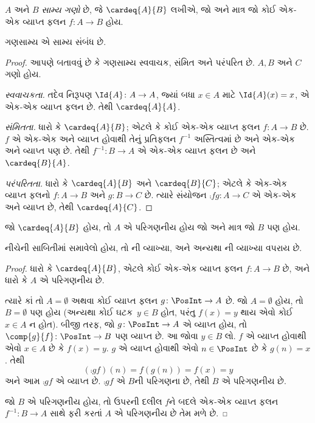 \begin{defn}
  $A$ અને $B$ \emph{સામ્ય ગણો} છે, જે $\cardeq{A}{B}$ લખીએ,
  જો અને માત્ર જો કોઈ એક-એક વ્યાપ્ત ફલન $f \colon A \to B$ હોય.
\end{defn}

\begin{prop}
ગણસામ્ય એ સામ્ય સંબંધ છે.
\end{prop}

\begin{proof}
આપણે બતાવવું છે કે ગણસામ્ય સ્વવાચક, સંમિત અને પરંપરિત છે.
$A, B$ અને $C$ ગણો હોય.

\emph{સ્વવાચકતા.} તદેવ નિરૂપણ $\Id{A} \colon A \to A$, જ્યાં
બધા $x \in A$ માટે $\Id{A} (x) = x$, એ એક-એક વ્યાપ્ત ફલન છે.
તેથી $\cardeq{A}{A}$.

\emph{સંમિતતા.} ધારો કે $\cardeq{A}{B}$; એટલે કે કોઈ
એક-એક વ્યાપ્ત ફલન $f\colon A \to B$ છે. $f$ એ એક-એક અને વ્યાપ્ત હોવાથી
તેનું પ્રતિફલન $f^{-1}$ અસ્તિત્વમાં છે અને એક-એક અને વ્યાપ્ત પણ છે.
તેથી $f^{-1}\colon B \to A$ એ એક-એક વ્યાપ્ત ફલન છે અને
$\cardeq{B}{A}$.

\emph{પરંપરિતતા.} ધારો કે $\cardeq{A}{B}$ અને $\cardeq{B}{C}$;
એટલે કે એક-એક વ્યાપ્ત ફલનો $f\colon A \to B$ અને $g\colon B \to
C$ છે. ત્યારે સંયોજન $\comp{f}{g}\colon A \to C$ એ એક-એક અને વ્યાપ્ત
છે, તેથી $\cardeq{A}{C}$.
\end{proof}

\begin{prop}
જો $\cardeq{A}{B}$ હોય, તો $A$ એ પરિગણનીય હોય જો અને
માત્ર જો $B$ પણ હોય.
\end{prop}

\begin{editorial}
નીચેની સાબિતીમાં  સમાવેલો હોય, તો
ની વ્યાખ્યા, અને અન્યથા
ની વ્યાખ્યા વપરાય છે.
\end{editorial}

\begin{proof}
ધારો કે $\cardeq{A}{B}$, એટલે કોઈ એક-એક વ્યાપ્ત ફલન
$f \colon A \to B$ છે, અને ધારો કે $A$ એ પરિગણનીય છે.

  ત્યારે કાં તો $A = \emptyset$ અથવા કોઈ વ્યાપ્ત ફલન
  $g\colon \PosInt \to A$ છે. જો $A = \emptyset$ હોય, તો
  $B = \emptyset$ પણ હોય (અન્યથા કોઈ ઘટક~$y \in B$ હોત,
  પરંતુ $f(x) = y$ થાય એવો કોઈ $x \in A$ ન હોત). બીજી તરફ,
  જો $g\colon \PosInt \to A$ એ વ્યાપ્ત હોય, તો
  $\comp{g}{f} \colon \PosInt \to B$ પણ વ્યાપ્ત છે.
  આ જોવા $y \in B$ લો. $f$ એ વ્યાપ્ત હોવાથી એવો
  $x \in A$ છે કે $f(x) = y$. $g$ એ વ્યાપ્ત હોવાથી
  એવો $n \in \PosInt$ છે કે $g(n) = x$. તેથી
\[
(\comp{g}{f})(n) = f(g(n)) = f(x) = y
\]
અને આમ $\comp{g}{f}$ એ વ્યાપ્ત છે. $\comp{g}{f}$ એ
$B$ની પરિગણના છે, તેથી $B$ એ પરિગણનીય છે.

જો $B$ એ પરિગણનીય હોય, તો ઉપરની દલીલ $f$ને બદલે
એક-એક વ્યાપ્ત ફલન $f^{-1}\colon B \to A$ સાથે ફરી કરતાં $A$ એ
પરિગણનીય છે તેમ મળે છે.
\end{proof}

